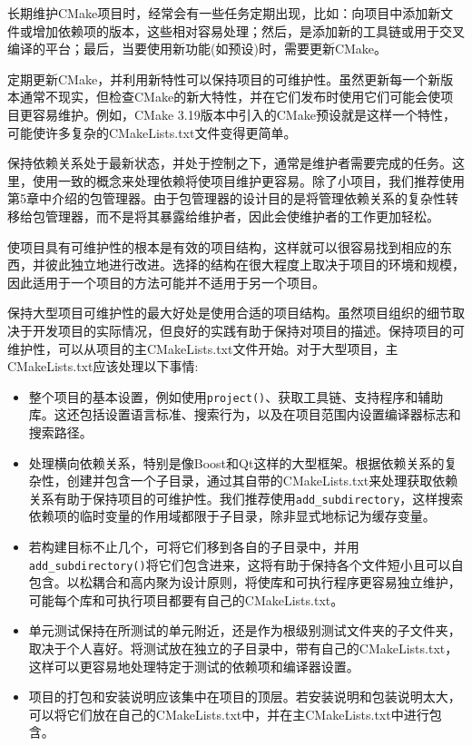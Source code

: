长期维护CMake项目时，经常会有一些任务定期出现，比如：向项目中添加新文件或增加依赖项的版本，这些相对容易处理；然后，是添加新的工具链或用于交叉编译的平台；最后，当要使用新功能(如预设)时，需要更新CMake。

定期更新CMake，并利用新特性可以保持项目的可维护性。虽然更新每一个新版本通常不现实，但检查CMake的新大特性，并在它们发布时使用它们可能会使项目更容易维护。例如，CMake 3.19版本中引入的CMake预设就是这样一个特性，可能使许多复杂的CMakeLists.txt文件变得更简单。

保持依赖关系处于最新状态，并处于控制之下，通常是维护者需要完成的任务。这里，使用一致的概念来处理依赖将使项目维护更容易。除了小项目，我们推荐使用第5章中介绍的包管理器。由于包管理器的设计目的是将管理依赖关系的复杂性转移给包管理器，而不是将其暴露给维护者，因此会使维护者的工作更加轻松。

使项目具有可维护性的根本是有效的项目结构，这样就可以很容易找到相应的东西，并彼此独立地进行改进。选择的结构在很大程度上取决于项目的环境和规模，因此适用于一个项目的方法可能并不适用于另一个项目。

保持大型项目可维护性的最大好处是使用合适的项目结构。虽然项目组织的细节取决于开发项目的实际情况，但良好的实践有助于保持对项目的描述。保持项目的可维护性，可以从项目的主CMakeLists.txt文件开始。对于大型项目，主CMakeLists.txt应该处理以下事情:

\begin{itemize}
\item 
整个项目的基本设置，例如使用\texttt{project()}、获取工具链、支持程序和辅助库。这还包括设置语言标准、搜索行为，以及在项目范围内设置编译器标志和搜索路径。

\item 
处理横向依赖关系，特别是像Boost和Qt这样的大型框架。根据依赖关系的复杂性，创建并包含一个子目录，通过其自带的CMakeLists.txt来处理获取依赖关系有助于保持项目的可维护性。我们推荐使用\texttt{add\_subdirectory}，这样搜索依赖项的临时变量的作用域都限于子目录，除非显式地标记为缓存变量。

\item 
若构建目标不止几个，可将它们移到各自的子目录中，并用\texttt{add\_subdirectory()}将它们包含进来，这将有助于保持各个文件短小且可以自包含。以松耦合和高内聚为设计原则，将使库和可执行程序更容易独立维护，可能每个库和可执行项目都要有自己的CMakeLists.txt。

\item 
单元测试保持在所测试的单元附近，还是作为根级别测试文件夹的子文件夹，取决于个人喜好。将测试放在独立的子目录中，带有自己的CMakeLists.txt，这样可以更容易地处理特定于测试的依赖项和编译器设置。

\item 
项目的打包和安装说明应该集中在项目的顶层。若安装说明和包装说明太大，可以将它们放在自己的CMakeLists.txt中，并在主CMakeLists.txt中进行包含。
\end{itemize}

